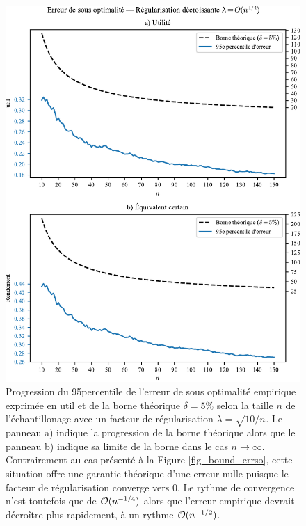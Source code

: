 \begin{figure}[h!]
  \centering
  \includegraphics[width=\textwidth]{../experiments/fig/bound_errso3.pdf}
  \caption{Progression du 95\ieme percentile de l'erreur de sous optimalité empirique
    exprimée en util et de la borne théorique $\delta=5\%$ selon la taille $n$ de
    l'échantillonage avec un facteur de régularisation $\lambda = \sqrt{10/n}$. Le panneau a)
    indique la progression de la borne théorique alors que le panneau b) indique sa limite
    de la borne dans le cas $n\to\infty$. Contrairement au cas présenté à la Figure
    \ref{fig_bound_errso}, cette situation offre une garantie théorique d'une erreur nulle
    puisque le facteur de régularisation converge vers 0. Le rythme de convergence n'est
    toutefois que de $\mathcal O(n^{-1/4})$ alors que l'erreur empirique devrait décroître plus
    rapidement, à un rythme $\mathcal O(n^{-1/2})$. }
  \label{fig_bound_errso3}
\end{figure}


\clearpage

